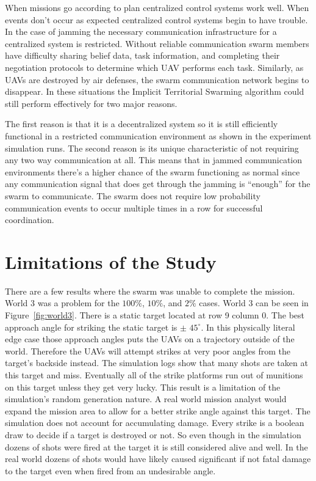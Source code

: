 When missions go according to plan centralized control systems work well.  When events don't occur as expected centralized control systems begin to have trouble.  In the case of jamming the necessary communication infrastructure for a centralized system is restricted.  Without reliable communication swarm members have difficulty sharing belief data, task information, and completing their negotiation protocols to determine which UAV performs each task.  Similarly, as UAVs are destroyed by air defenses, the swarm communication network begins to disappear.  In these situations the Implicit Territorial Swarming algorithm could still perform effectively for two major reasons.

The first reason is that it is a decentralized system so it is still efficiently functional in a restricted communication environment as shown in the experiment simulation runs. The second reason is its unique characteristic of not requiring any two way communication at all.  This means that in jammed communication environments there's a higher chance of the swarm functioning as normal since any communication signal that does get through the jamming is ``enough'' for the swarm to communicate.  The swarm does not require low probability communication events to occur multiple times in a row for successful coordination.


\section{Limitations of the Study}
There are a few results where the swarm was unable to complete the mission.  World 3 was a problem for the $100\%$, $10\%$, and $2\%$ cases.  World 3 can be seen in Figure~\ref{fig:world3}.  There is a static target located at row 9 column 0.  The best approach angle for striking the static target is $\pm$ $45^{\circ}$.  In this physically literal edge case those approach angles puts the UAVs on a trajectory outside of the world.  Therefore the UAVs will attempt strikes at very poor angles from the target's backside instead.  The simulation logs show that many shots are taken at this target and miss.  Eventually all of the strike platforms run out of munitions on this target unless they get very lucky.  This result is a limitation of the simulation's random generation nature.  A real world mission analyst would expand the mission area to allow for a better strike angle against this target.  The simulation does not account for accumulating damage.  Every strike is a boolean draw to decide if a target is destroyed or not.  So even though in the simulation dozens of shots were fired at the target it is still considered alive and well.  In the real world dozens of shots would have likely caused significant if not fatal damage to the target even when fired from an undesirable angle.

